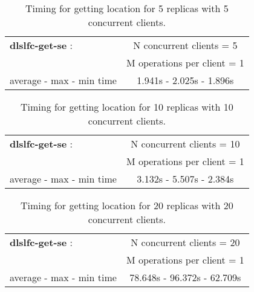\documentclass[pdftex]{cmspaper}
\begin{document}
\begin{table}[!htbp]
\begin{center}
 \begin{tabular}{|l|c|}         \hline
   {\bf dlslfc-get-se} :  & N concurrent clients = 5  \\ & M operations per client = 1\\ \hline
    average - max - min time     &   1.941s - 2.025s - 1.896s  \\ \hline
\end{tabular}
\caption {Timing for getting location for 5 replicas with 5 concurrent clients.}\label{dlslfc-get-se}
\end{center}
\end{table}

\begin{table}[!htbp]
\begin{center}
 \begin{tabular}{|l|c|}         \hline
   {\bf dlslfc-get-se} : & N concurrent clients = 10  \\ & M operations per client = 1\\ \hline
    average - max - min time     & 3.132s - 5.507s - 2.384s \\ \hline
\end{tabular}
\caption {Timing for getting location for 10 replicas with 10 concurrent clients.}\label{dlslfc-get-se}
\end{center}
\end{table}

\begin{table}[!htbp]
\begin{center}
 \begin{tabular}{|l|c|}         \hline
   {\bf dlslfc-get-se} : & N concurrent clients = 20  \\ & M operations per client = 1\\ \hline
    average - max - min time     & 78.648s - 96.372s - 62.709s \\ \hline
\end{tabular}
\caption {Timing for getting location for 20 replicas with 20 concurrent clients.}\label{dlslfc-get-se}
\end{center}
\end{table}
\end{document}
